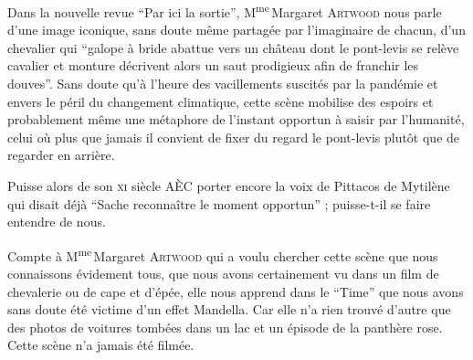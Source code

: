 \begin{prose}
  Dans la nouvelle revue \enquote{Par ici la sortie}, M\textsuperscript{me}\,Margaret \textsc{Artwood} nous parle d’une image iconique, sans doute même partagée par l’imaginaire de chacun, d’un chevalier qui \enquote{galope à bride abattue vers un château dont le pont-levis se relève \textelp{} cavalier et monture décrivent alors un saut prodigieux afin de franchir les douves}. Sans doute qu’à l’heure des vacillements suscités par la pandémie et envers le péril du changement climatique, cette scène mobilise des espoirs et probablement même une métaphore de l’instant opportun à saisir par l’humanité, celui où plus que jamais il convient de fixer du regard le pont-levis plutôt que de regarder en arrière.

  Puisse alors de son \textsc{xi}\ieme{} siècle AÈC porter encore la voix de Pittacos de Mytilène qui disait déjà \enquote{Sache reconnaître le moment opportun} ; puisse-t-il se faire entendre de nous.

  Compte à M\textsuperscript{me}\,Margaret \textsc{Artwood} qui a voulu chercher cette scène que nous connaissons évidement tous, que nous avons certainement vu dans un film de chevalerie ou de cape et d’épée, elle nous apprend dans le \enquote{Time} que nous avons sans doute été victime d’un effet Mandella. Car elle n’a rien trouvé d’autre que des photos de voitures tombées dans un lac et un épisode de la panthère rose. Cette scène n’a jamais été filmée.
\end{prose}


